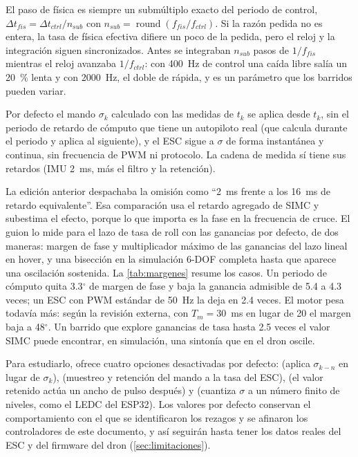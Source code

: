 El paso de física es siempre un submúltiplo exacto del periodo de control,
$\Delta t_{fis}=\Delta t_{ctrl}/n_{sub}$ con $n_{sub}=\operatorname{round}(f_{fis}/f_{ctrl})$.
Si la razón pedida no es entera, la tasa de física efectiva difiere un poco
de la pedida, pero el reloj y la integración siguen sincronizados. Antes se
integraban $n_{sub}$ pasos de $1/f_{fis}$ mientras el reloj avanzaba
$1/f_{ctrl}$: con 400~Hz de control una caída libre salía un 20~\% lenta y
con 2000~Hz, el doble de rápida, y  es un parámetro que los
barridos pueden variar.

\begin{nota}
Por defecto el mando $\sigma_k$ calculado con las medidas de $t_k$ se aplica
desde $t_k$, sin el periodo de retardo de cómputo que tiene un autopiloto
real (que calcula durante el periodo y aplica al siguiente), y el ESC sigue a
$\sigma$ de forma instantánea y continua, sin frecuencia de PWM ni
protocolo. La cadena de medida sí tiene sus retardos (IMU 2~ms, más el filtro
y la retención).

La edición anterior despachaba la omisión como ``2~ms frente a los 16~ms de
retardo equivalente''. Esa comparación usa el retardo agregado de SIMC y
subestima el efecto, porque lo que importa es la fase en la frecuencia de
cruce. El guion  lo mide para el lazo de
tasa de roll con las ganancias por defecto, de dos maneras: margen de fase y
multiplicador máximo de las ganancias del lazo lineal en hover, y una
bisección en la simulación 6-DOF completa hasta que aparece una oscilación
sostenida. La \cref{tab:margenes} resume los casos. Un periodo de cómputo
quita 3.3$^\circ$ de margen de fase y baja la ganancia admisible de 5.4 a
4.3 veces; un ESC con PWM estándar de 50~Hz la deja en 2.4 veces. El motor
pesa todavía más: según la revisión externa, con $T_m=30$~ms en lugar de 20
el margen baja a 48$^\circ$. Un barrido que explore ganancias de tasa hasta
2.5 veces el valor SIMC puede encontrar, en simulación, una sintonía que en
el dron oscile.

Para estudiarlo,  ofrece cuatro opciones desactivadas por
defecto:  (aplica $\sigma_{k-n}$ en lugar de
$\sigma_k$),  (muestreo y retención del mando a la tasa
del ESC),  (el valor retenido actúa un ancho de
pulso después) y  (cuantiza $\sigma$ a un número finito
de niveles, como el LEDC del ESP32). Los valores por defecto conservan el
comportamiento con el que se identificaron los rezagos y se afinaron los
controladores de este documento, y así seguirán hasta tener los datos reales
del ESC y del firmware del dron (\cref{sec:limitaciones}).
\end{nota}

